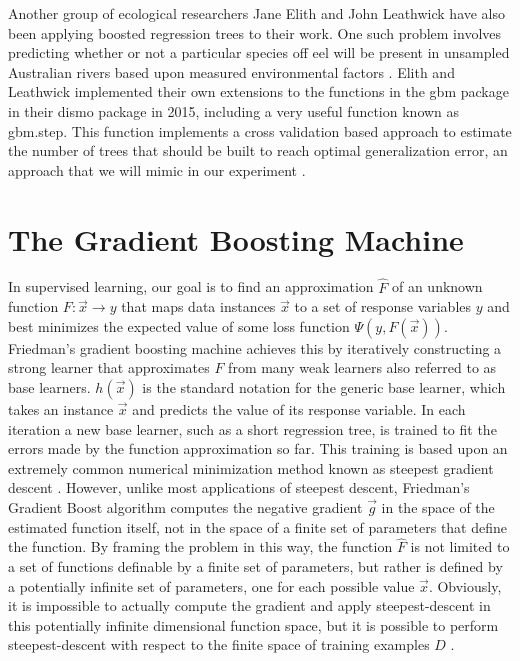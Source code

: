 \documentclass[9pt, conference]{IEEEtran}
\begin{document}
Another group of ecological researchers Jane Elith and John Leathwick have also been applying boosted regression trees to their work. One such problem involves predicting whether or not a particular species off eel will be present in unsampled Australian rivers based upon measured environmental factors \cite{ecological}.  Elith and Leathwick implemented their own extensions to the functions in the gbm package in their dismo package in 2015, including a very useful function known as gbm.step. This function implements a cross validation based approach to estimate the number of trees that should be built to reach optimal generalization error, an approach that we will mimic in our experiment \cite{elith2015boosted}. 


\section{The Gradient Boosting Machine}
\label{sec:GradientBoostingMachine}
In supervised learning, our goal is to find an approximation \(\hat{F}\) of an unknown function \(F: \vec{x} \rightarrow y\) that maps data instances \(\vec{x}\) to a set of response variables \(y\) and best minimizes the expected value of some loss function \( \Psi(y, F(\vec{x})) \). 
Friedman's gradient boosting machine achieves this by iteratively constructing a strong learner that approximates \(F\) from many weak learners also referred to as base learners. \(h(\vec{x})\) is the standard notation for the generic base learner, which takes an instance \(\vec{x}\) and predicts the value of its response variable. In each iteration a new base learner, such as a short regression tree, is trained to fit the errors made by the function approximation so far. This training is based upon an extremely common numerical minimization method known as steepest gradient descent \cite{2012ridgeway} \cite{2001Friedman} . 
However, unlike most applications of steepest descent, Friedman's Gradient Boost algorithm computes the negative gradient \(\vec{g}\) in the space of the estimated function itself, not in the space of a finite set of parameters that define the function. By framing the problem in this way, the function \(\hat{F}\) is not limited to a set of functions definable by a finite set of parameters, but rather is defined by a potentially infinite set of parameters, one for each possible value \(\vec{x}\). Obviously, it is impossible to actually compute the gradient and apply steepest-descent in this potentially infinite dimensional function space, but it is possible to perform steepest-descent with respect to the finite space of training examples \(D\) \cite{2012ridgeway} \cite{2001Friedman}. 
\end{document}
